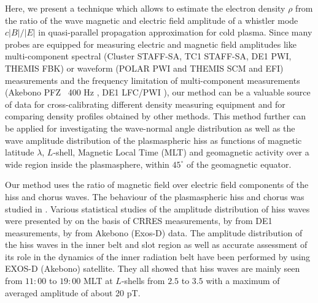 \documentclass[a4paper]{article}
\begin{document}
Here, we present a technique which allows to estimate the electron density $\rho$ from the ratio of the wave magnetic and electric field amplitude of a whistler mode $c|B|/|E|$ in quasi-parallel propagation approximation for cold plasma. Since many probes are equipped for measuring electric and magnetic field amplitudes like multi-component spectral (Cluster STAFF-SA, TC1 STAFF-SA, DE1 PWI, THEMIS FBK) or waveform (POLAR PWI and THEMIS SCM and EFI) measurements and the frequency limitation of multi-component measurements (Akebono PFZ ~400 Hz \citep{kimura1990vlf}, DE1 LFC/PWI \citep{shawhan1981plasma}), our method can be a valuable source of data for cross-calibrating different density measuring equipment and for comparing density profiles obtained by other methods.  This method further can be applied for investigating the wave-normal angle distribution as well as the wave amplitude distribution of the plasmaspheric hiss as functions of magnetic latitude $\lambda$, $L$-shell, Magnetic Local Time (MLT) and geomagnetic activity over a wide region inside the plasmasphere, within $45^\circ$ of the geomagnetic equator.

Our method uses the ratio of magnetic field over electric field components of the hiss and chorus waves. The behaviour of the plasmaspheric hiss and chorus was studied in \citep{hayakawa1986direction, agapitov2011statistical, agapitov2012correction, agapitov2013statistics}. Various statistical studies of the amplitude distribution of hiss waves were presented by \citet{meredith2004substorm} on the basis of CRRES measurements, by \citet{green2005origin} from DE1 measurements, by \citet{kimura1990vlf} from Akebono (Exos-D) data. The amplitude distribution of the hiss waves in the inner belt and slot region as well as accurate assessment of its role in the dynamics of the inner radiation belt have been performed by \citet{agapitov2014inner} using EXOS-D (Akebono) satellite. They all showed that hiss waves are mainly seen from $11:00$ to $19:00$ MLT at $L$-shells from $2.5$ to $3.5$ with a maximum of averaged amplitude of about 20 pT.
\end{document}
